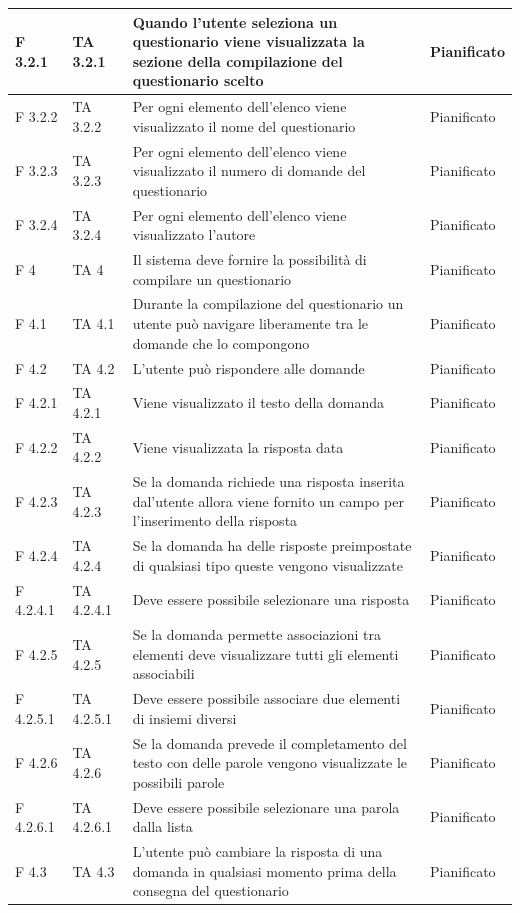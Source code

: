 \documentclass[a4paper,11pt]{article}
\begin{document}
\begin{longtable}{p{}p{}p{}p{}}
\midrule
F 3.2.1 &TA 3.2.1&Quando l'utente seleziona un questionario viene visualizzata la sezione della compilazione del questionario scelto & Pianificato\\
\midrule
F 3.2.2 &TA 3.2.2&Per ogni elemento dell'elenco viene visualizzato il nome del questionario & Pianificato\\
\midrule
F 3.2.3 & TA 3.2.3 &Per ogni elemento dell'elenco viene visualizzato il numero di domande del questionario & Pianificato\\
\midrule
F 3.2.4 &TA 3.2.4 &Per ogni elemento dell'elenco viene visualizzato l'autore & Pianificato\\
\midrule
F 4 & TA 4&Il sistema deve fornire la possibilità di compilare un questionario & Pianificato\\
\midrule
F 4.1 &TA 4.1 &Durante la compilazione del questionario un utente può navigare liberamente tra le domande che lo compongono & Pianificato\\
\midrule
F 4.2 & TA 4.2 &L'utente può rispondere alle domande & Pianificato\\
\midrule
F 4.2.1 &TA 4.2.1&Viene visualizzato il testo della domanda & Pianificato\\
\midrule
F 4.2.2 &TA 4.2.2 &Viene visualizzata la risposta data & Pianificato\\
\midrule
F 4.2.3 & TA 4.2.3 &Se la domanda richiede una risposta inserita dal'utente allora viene fornito un campo per l'inserimento della risposta & Pianificato\\
\midrule
F 4.2.4 &TA 4.2.4 &Se la domanda ha delle risposte preimpostate di qualsiasi tipo queste vengono visualizzate & Pianificato\\
\midrule
F 4.2.4.1 & TA 4.2.4.1 &Deve essere possibile selezionare una risposta & Pianificato\\
\midrule
F 4.2.5 & TA 4.2.5 &Se la domanda permette associazioni tra elementi deve visualizzare tutti gli elementi associabili & Pianificato\\
\midrule
F 4.2.5.1 & TA 4.2.5.1 &Deve essere possibile associare due elementi di insiemi diversi & Pianificato\\
\midrule
F 4.2.6 & TA 4.2.6 &Se la domanda prevede il completamento del testo con delle parole vengono visualizzate le possibili parole & Pianificato\\
\midrule
F 4.2.6.1 & TA 4.2.6.1 &Deve essere possibile selezionare una parola dalla lista & Pianificato\\
\midrule
F 4.3 & TA 4.3&L'utente può cambiare la risposta di una domanda in qualsiasi momento prima della consegna del questionario & Pianificato\\

\end{longtable}
\end{document}
